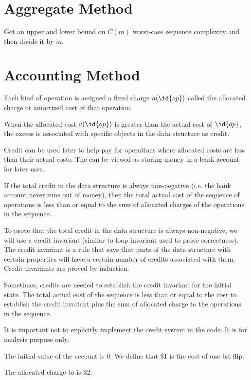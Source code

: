 \section{Aggregate Method}

Get an upper and lower bound on $C(m)$ worst-case sequence complexity and then divide it by $m$.

\section{Accounting Method}

Each kind of operation is assigned a fixed charge $a(\id{op})$ called the allocated charge or amortized cost of that operation.

When the allocated cost $a(\id{op})$ is greater than the actual cost of $\id{op}$, the excess is associated with specific objects in the data structure as credit.

Credit can be used later to help pay for operations where allocated costs are less than their actual costs. The can be viewed as storing money in a bank account for later uses.

If the total credit in the data structure is always non-negative (i.e. the bank account never runs out of money), then the total actual cost of the sequence of operations is less than or equal to the sum of allocated charges of the operations in the sequence.

To prove that the total credit in the data structure is always non-negative, we will use a credit invariant (similar to loop invariant used to prove correctness). The credit invariant is a rule that says that parts of the data structure with certain properties will have a certain number of credits associated with them. Credit invariants are proved by induction.

Sometimes, credits are needed to establish the credit invariant for the initial state. The total actual cost of the sequence is less than or equal to the cost to establish the credit invariant plus the sum of allocated charge to the operations in the sequence.

\begin{remark}
    It is important not to explicitly implement the credit system in the code. It is for analysis purpose only.
\end{remark}

The initial value of the account is 0. We define that \$1 is the cost of one bit flip.

The allocated charge to  is \$2.

